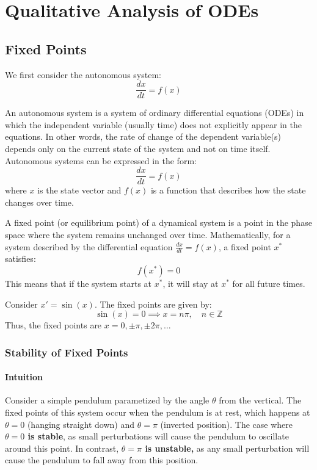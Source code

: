 \documentclass[11pt]{article}
\begin{document}
\section{Qualitative Analysis of ODEs}
\subsection{Fixed Points}

We first consider the autonomous system:
\begin{equation}
    \frac{dx}{dt} = f(x)
\end{equation}

\begin{definition}
    An autonomous system is a system of ordinary differential equations (ODEs) in which the independent variable (usually time) does not explicitly appear in the equations. In other words, the rate of change of the dependent variable(s) depends only on the current state of the system and not on time itself. Autonomous systems can be expressed in the form:
    $$
    \frac{dx}{dt} = f(x)
    $$
    where \( x \) is the state vector and \( f(x) \) is a function that describes how the state changes over time.
\end{definition}

\begin{definition}
    A fixed point (or equilibrium point) of a dynamical system is a point in the phase space where the system remains unchanged over time. Mathematically, for a system described by the differential equation \( \frac{dx}{dt} = f(x) \), a fixed point \( x^* \) satisfies:
    $$
    f(x^*) = 0
    $$
    This means that if the system starts at \( x^* \), it will stay at \( x^* \) for all future times.
\end{definition}

\begin{example}
    Consider $x' = \sin(x)$. The fixed points are given by:
    $$
    \sin(x) = 0 \implies x = n\pi, \quad n \in \mathbb{Z}
    $$
    Thus, the fixed points are \( x = 0, \pm \pi, \pm 2\pi, \ldots \)
\end{example}

\subsubsection{Stability of Fixed Points}
\paragraph{Intuition} Consider a simple pendulum parametized by the angle \( \theta \) from the vertical. The fixed points of this system occur when the pendulum is at rest, which happens at \( \theta = 0 \) (hanging straight down) and \( \theta = \pi \) (inverted position). The case where \textbf{\( \theta = 0 \) is stable}, as small perturbations will cause the pendulum to oscillate around this point. In contrast, \textbf{\( \theta = \pi \) is unstable,} as any small perturbation will cause the pendulum to fall away from this position.
\end{document}
